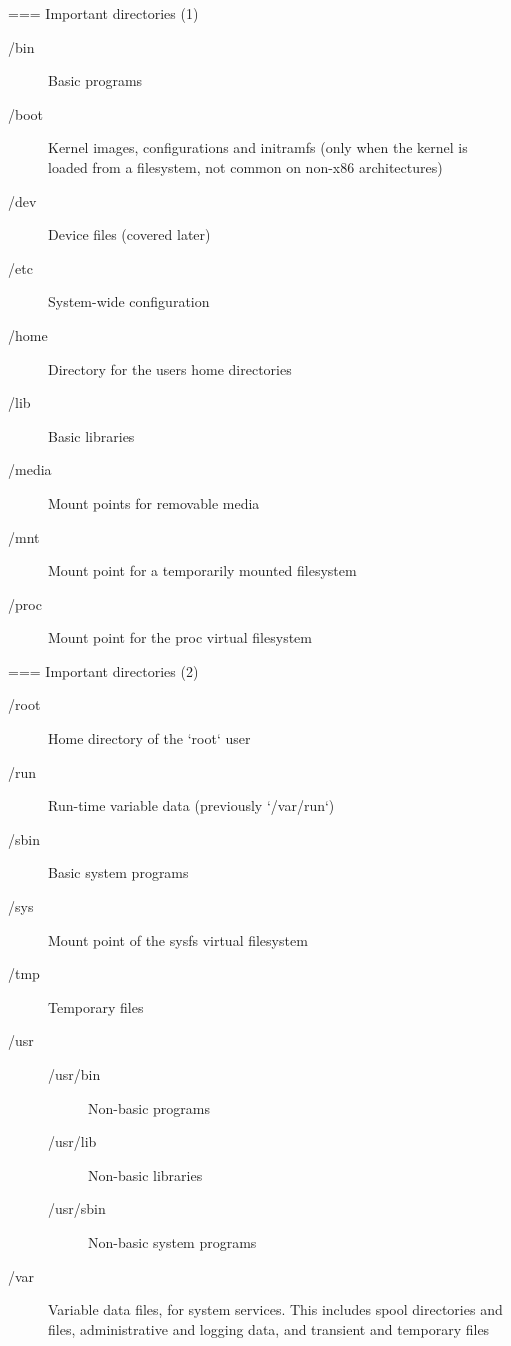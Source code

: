 === Important directories (1)
  \begin{description}
  \item[/bin] Basic programs
  \item[/boot] Kernel images, configurations and initramfs
    (only when the kernel is loaded from a
    filesystem, not common on non-x86 architectures)
  \item[/dev] Device files (covered later)
  \item[/etc] System-wide configuration
  \item[/home] Directory for the users home directories
  \item[/lib] Basic libraries
  \item[/media] Mount points for removable media
  \item[/mnt] Mount point for a temporarily mounted filesystem
  \item[/proc] Mount point for the proc virtual filesystem
  \end{description}


=== Important directories (2)
  \begin{description}
  \item[/root]Home directory of the `root` user
  \item[/run]Run-time variable data (previously `/var/run`)
  \item[/sbin]Basic system programs
  \item[/sys]Mount point of the sysfs virtual filesystem
  \item[/tmp]Temporary files
  \item[/usr]
    \begin{description}
    \item[/usr/bin]Non-basic programs
    \item[/usr/lib]Non-basic libraries
    \item[/usr/sbin]Non-basic system programs
    \end{description}
  \item[/var] Variable data files, for system services. This includes spool directories and
    files, administrative and logging data, and transient and
    temporary files
  \end{description}


